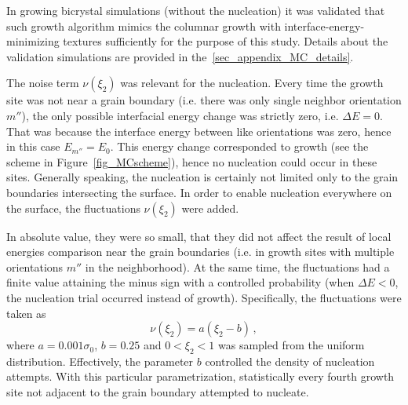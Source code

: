 In growing bicrystal simulations (without the nucleation) it was validated that such growth algorithm mimics the columnar growth with interface-energy-minimizing textures sufficiently for the purpose of this study. Details about the validation simulations are provided in the~\ref{sec_appendix_MC_details}.

The noise term $\nu(\xi_2)$ was relevant for the nucleation. Every time the growth site was not near a grain boundary (i.e. there was only single neighbor orientation $m''$), the only possible interfacial energy change was strictly zero, i.e. $\Delta E=0$. That was because the interface energy between like orientations was zero, hence in this case $E_{m''}=E_0$. This energy change corresponded to growth (see the scheme in Figure~\ref{fig_MCscheme}), hence no nucleation could occur in these sites. Generally speaking, the nucleation is certainly not limited only to the grain boundaries intersecting the surface. In order to enable nucleation everywhere on the surface, the fluctuations $\nu(\xi_2)$ were added.

In absolute value, they were so small, that they did not affect the result of local energies comparison near the grain boundaries (i.e. in growth sites with multiple orientations $m''$ in the neighborhood). At the same time, the fluctuations had a finite value attaining the minus sign with a controlled probability (when $\Delta E<0$, the nucleation trial occurred instead of growth). Specifically, the fluctuations were taken as
\begin{equation}
	\nu(\xi_2) = a(\xi_2-b) \,,
\end{equation}
where $a=0.001\sigma_0$, $b=0.25$ and $0<\xi_2<1$ was sampled from the uniform distribution. Effectively, the parameter $b$ controlled the density of nucleation attempts. With this particular parametrization, statistically every fourth growth site not adjacent to the grain boundary attempted to nucleate.

